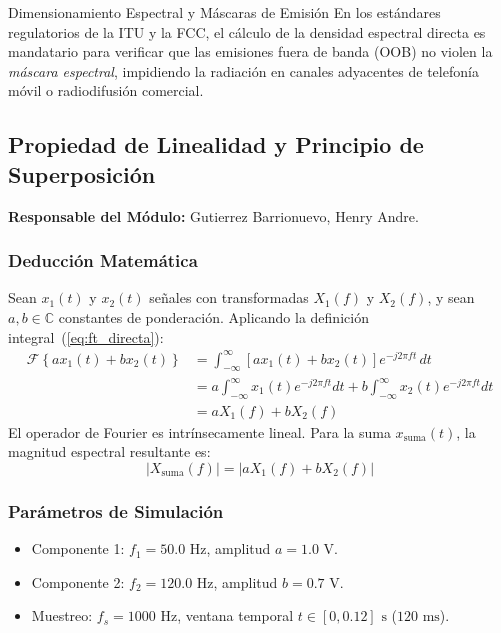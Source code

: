\documentclass[11pt,a4paper]{article}
\begin{document}
\begin{telecomAppBox}{Dimensionamiento Espectral y M\'ascaras de Emisi\'on}
En los est\'andares regulatorios de la ITU y la FCC, el c\'alculo de la densidad espectral directa es mandatario para verificar que las emisiones fuera de banda (OOB) no violen la \textit{m\'ascara espectral}, impidiendo la radiaci\'on en canales adyacentes de telefon\'ia m\'ovil o radiodifusi\'on comercial.
\end{telecomAppBox}

\subsection{Propiedad de Linealidad y Principio de Superposici\'on}
\textbf{Responsable del M\'odulo:} Gutierrez Barrionuevo, Henry Andre.

\subsubsection{Deducci\'on Matem\'atica}
Sean $x_1(t)$ y $x_2(t)$ se\~nales con transformadas $X_1(f)$ y $X_2(f)$, y sean $a, b \in \mathbb{C}$ constantes de ponderaci\'on. Aplicando la definici\'on integral~(\ref{eq:ft_directa}):
\begin{align}
  \mathcal{F}\left\{ a x_1(t) + b x_2(t) \right\} &= \int_{-\infty}^{\infty} \left[ a x_1(t) + b x_2(t) \right] e^{-j 2\pi f t} \, dt \nonumber \\
  &= a \int_{-\infty}^{\infty} x_1(t) e^{-j 2\pi f t} dt + b \int_{-\infty}^{\infty} x_2(t) e^{-j 2\pi f t} dt \nonumber \\
  &= a X_1(f) + b X_2(f)
\end{align}
El operador de Fourier es intr\'insecamente lineal. Para la suma $x_{\text{suma}}(t)$, la magnitud espectral resultante es:
\begin{equation}
  |X_{\text{suma}}(f)| = |a X_1(f) + b X_2(f)|
\end{equation}

\subsubsection{Par\'ametros de Simulaci\'on}
\begin{itemize}[noitemsep]
  \item Componente 1: $f_1 = 50.0\text{ Hz}$, amplitud $a = 1.0\text{ V}$.
  \item Componente 2: $f_2 = 120.0\text{ Hz}$, amplitud $b = 0.7\text{ V}$.
  \item Muestreo: $f_s = 1000\text{ Hz}$, ventana temporal $t \in [0, 0.12]\text{ s}$ ($120\text{ ms}$).
\end{itemize}
\end{document}
